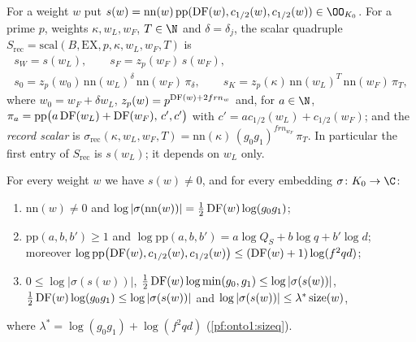 \begin{definition}[Scalars]\label{pf:onto3:scal}
For a weight $w$ put $s(w)=\mathrm{nn}(w)\,\mathrm{pp}(\ontothreeDF(w),c_{1/2}(w),c_{1/2}(w))\in\OO_{K_0}$. For a prime
$p$, weights $\kappa,w_L,w_F$, $T\in\N$ and $\delta=\delta_j$, the scalar quadruple $S_{\mathrm{rec}}=\mathrm{scal}(B,
\mathrm{EX},p,\kappa,w_L,w_F,T)$ is
\begin{gather*}
s_W=s(w_L),\qquad s_F=z_p(w_F)\,s(w_F),\\
s_0=z_p(w_0)\,\mathrm{nn}(w_L)^{\delta}\,\mathrm{nn}(w_F)\,\pi_\delta,\qquad
s_K=z_p(\kappa)\,\mathrm{nn}(w_L)^{T}\,\mathrm{nn}(w_F)\,\pi_T,
\end{gather*}
where $w_0=w_F+\delta w_L$, $z_p(w)=p^{\operatorname{DF}(w)+2frn_w}$ and, for $a\in\N$,
$\pi_a=\mathrm{pp}\bigl(a\operatorname{DF}(w_L)+\operatorname{DF}(w_F),\,c',c'\bigr)$ with $c'=ac_{1/2}(w_L)+c_{1/2}(w_F)$; and the
\emph{record scalar} is $\sigma_{\mathrm{rec}}(\kappa,w_L,w_F,T)=\mathrm{nn}(\kappa)\,(g_0g_1)^{frn_{w_F}}\,\pi_T$.
In particular the first entry of $S_{\mathrm{rec}}$ is $s(w_L)$; it depends on $w_L$ only.
\end{definition}

\begin{lemma}\label{pf:onto3:sof}
For every weight $w$ we have $s(w)\ne0$, and for every embedding $\sigma\colon K_0\to\C$:
\begin{enumerate}[label=(\roman*)]
\item $\mathrm{nn}(w)\ne0$ and $\log|\sigma(\mathrm{nn}(w))|=\frac12\operatorname{DF}(w)\log(g_0g_1)$;
\item $\mathrm{pp}(a,b,b')\ge1$ and $\log\mathrm{pp}(a,b,b')=a\log Q_S+b\log q+b'\log d$; moreover
$\log\mathrm{pp}\bigl(\operatorname{DF}(w),c_{1/2}(w),c_{1/2}(w)\bigr)\le(\operatorname{DF}(w)+1)\log(f^2qd)$;
\item $0\le\log|\sigma(s(w))|$, $\frac12\operatorname{DF}(w)\log\min(g_0,g_1)\le\log|\sigma(s(w))|$,
$\frac12\operatorname{DF}(w)\log(g_0g_1)\le\log|\sigma(s(w))|$ and $\log|\sigma(s(w))|\le\lambda^*\operatorname{size}(w)$,
\end{enumerate}
where $\lambda^*=\log(g_0g_1)+\log(f^2qd)$ (\cref{pf:onto1:sizeq}).
\end{lemma}

